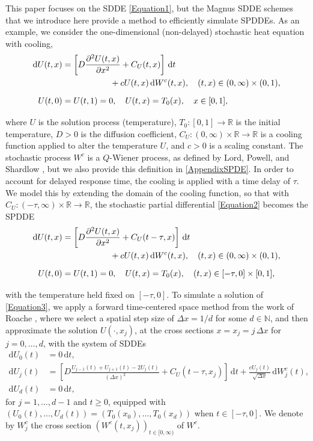 \documentclass[onefignum]{siamart250211}
\begin{document}
This paper focuses on the SDDE \cref{Equation1}, but the Magnus SDDE schemes that we introduce here provide a method to efficiently simulate SPDDEs. As an example, we consider the one-dimensional (non-delayed) stochastic heat equation with cooling,
\begin{align}
\mathrm{d}U(t,x)&=\left[D\frac{\partial^2U(t,x)}{\partial x^2}+C_U(t,x)\right]\,\mathrm{d}t\label{Equation2}\\
&\hspace{2cm}+cU(t,x)\,\mathrm{d}W^c(t,x),\quad(t,x)\in(0,\infty)\times(0,1),\nonumber\\
\vphantom{\int}U(t,0)&=U(t,1)=0,\quad U(t,x)=T_0(x),\quad x\in[0,1],\nonumber
\end{align}
where $U$ is the solution process (temperature), $T_0:[0,1]\to\mathbb{R}$ is the initial temperature, $D>0$ is the diffusion coefficient, $C_U:(0,\infty)\times\mathbb{R}\to\mathbb{R}$ is a cooling function applied to alter the temperature $U$, and $c>0$ is a scaling constant. The stochastic process $W^c$ is a $Q$-Wiener process, as defined by Lord, Powell, and Shardlow \cite{LordPowellShardlow2014}, but we also provide this definition in \cref{AppendixSPDE}. In order to account for delayed response time, the cooling is applied with a time delay of $\tau$. We model this by extending the domain of the cooling function, so that with $C_U:(-\tau,\infty)\times\mathbb{R}\to\mathbb{R}$, the stochastic partial differential \cref{Equation2} becomes the SPDDE
\begin{align}
\mathrm{d}U(t,x)&=\left[D\frac{\partial^2U(t,x)}{\partial x^2}+C_U(t-\tau,x)\right]\,\mathrm{d}t\label{Equation3}\\
&\hspace{2cm}+cU(t,x)\,\mathrm{d}W^c(t,x),\quad(t,x)\in(0,\infty)\times(0,1),\nonumber\\
\vphantom{\int}U(t,0)&=U(t,1)=0,\quad U(t,x)=T_0(x),\quad (t,x)\in[-\tau,0]\times[0,1],\nonumber
\end{align}
with the temperature held fixed on $[-\tau,0]$. To simulate a solution of \cref{Equation3}, we apply a forward time-centered space method from the work of Roache \cite{Roache1972}, where we select a spatial step size of $\Delta x=1/d$ for some $d\in\mathbb{N}$, and then approximate the solution $U(\cdot,x_j)$, at the cross sections $x=x_j=j\,\Delta x$ for $j=0,\ldots,d$, with the system of SDDEs
\begin{align}
\mathrm{d}U_0(t)&=0\,\mathrm{d}t,\label{Equation4}\\
\mathrm{d}U_j(t)&=\left[D\frac{U_{j-1}(t)+U_{j+1}(t)-2U_j(t)}{(\Delta x)^2}+C_U(t-\tau,x_j)\right]\,\mathrm{d}t+\frac{cU_j(t)}{\sqrt{\Delta x}}\,\mathrm{d}W_j^c(t),\nonumber\\
\mathrm{d}U_d(t)&=0\,\mathrm{d}t,\nonumber
\end{align}
for $j=1,\ldots,d-1$ and $t\geqslant0$, equipped with $(U_0(t),\ldots,U_d(t))=(T_0(x_0),\ldots,T_0(x_d))$ when $t\in[-\tau,0]$. We denote by $W_j^c$ the cross section $(W^c(t,x_j))_{t\in[0,\infty)}$ of $W^c$.
\end{document}
